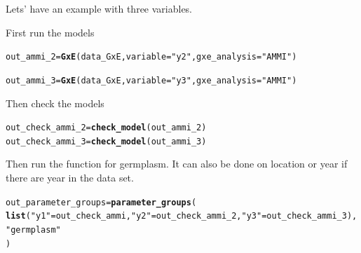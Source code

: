 \documentclass{book}\usepackage[]{graphicx}\usepackage[]{color}
\makeatletter
\newcommand{\hlstr}[1]{\textcolor[rgb]{0.192,0.494,0.8}{#1}}%
\newcommand{\hlstd}[1]{\textcolor[rgb]{0.345,0.345,0.345}{#1}}%
\newcommand{\hlkwb}[1]{\textcolor[rgb]{0.69,0.353,0.396}{#1}}%
\newcommand{\hlkwc}[1]{\textcolor[rgb]{0.333,0.667,0.333}{#1}}%
\newcommand{\hlkwd}[1]{\textcolor[rgb]{0.737,0.353,0.396}{\textbf{#1}}}%
\newenvironment{kframe}{%
 \def\at@end@of@kframe{}%
 \ifinner\ifhmode%
  \def\at@end@of@kframe{\end{minipage}}%
  \begin{minipage}{\columnwidth}%
 \fi\fi%
 \def\FrameCommand##1{\hskip\@totalleftmargin \hskip-\fboxsep
 \colorbox{shadecolor}{##1}\hskip-\fboxsep
     \hskip-\linewidth \hskip-\@totalleftmargin \hskip\columnwidth}%
 \MakeFramed {\advance\hsize-\width
   \@totalleftmargin\z@ \linewidth\hsize
   \@setminipage}}%
 {\par\unskip\endMakeFramed%
 \at@end@of@kframe}
\newenvironment{knitrout}{}{} %
\makeatother
\begin{document}
Lets' have an example with three variables.

First run the models
\begin{knitrout}
\color{fgcolor}\begin{kframe}
\begin{alltt}
\hlstd{out_ammi_2} \hlkwb{=} \hlkwd{GxE}\hlstd{(data_GxE,} \hlkwc{variable} \hlstd{=} \hlstr{"y2"}\hlstd{,} \hlkwc{gxe_analysis} \hlstd{=} \hlstr{"AMMI"}\hlstd{)}
\end{alltt}


{\ttfamily\noindent\itshape\color{messagecolor}{\#\# AMMI model done for y2}}\begin{alltt}
\hlstd{out_ammi_3} \hlkwb{=} \hlkwd{GxE}\hlstd{(data_GxE,} \hlkwc{variable} \hlstd{=} \hlstr{"y3"}\hlstd{,} \hlkwc{gxe_analysis} \hlstd{=} \hlstr{"AMMI"}\hlstd{)}
\end{alltt}


{\ttfamily\noindent\itshape\color{messagecolor}{\#\# AMMI model done for y3}}\end{kframe}
\end{knitrout}

Then check the models
\begin{knitrout}
\color{fgcolor}\begin{kframe}
\begin{alltt}
\hlstd{out_check_ammi_2} \hlkwb{=} \hlkwd{check_model}\hlstd{(out_ammi_2)}
\hlstd{out_check_ammi_3} \hlkwb{=} \hlkwd{check_model}\hlstd{(out_ammi_3)}
\end{alltt}
\end{kframe}
\end{knitrout}

Then run the function for germplasm. It can also be done on location or year if there are year in the data set.

\begin{knitrout}
\color{fgcolor}\begin{kframe}
\begin{alltt}
\hlstd{out_parameter_groups} \hlkwb{=} \hlkwd{parameter_groups}\hlstd{(}
  \hlkwd{list}\hlstd{(}\hlstr{"y1"} \hlstd{= out_check_ammi,} \hlstr{"y2"} \hlstd{= out_check_ammi_2,} \hlstr{"y3"} \hlstd{= out_check_ammi_3),}
  \hlstr{"germplasm"}
  \hlstd{)}
\end{alltt}
\end{kframe}
\end{knitrout}
\end{document}
